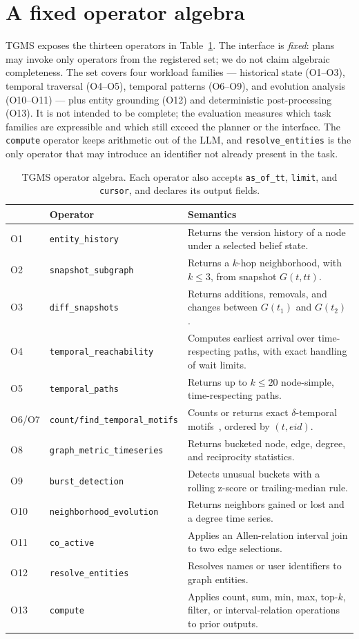 \documentclass[11pt]{article}
\begin{document}
\section{A fixed operator algebra}
\label{sec:operators}
TGMS exposes the thirteen operators in Table~\ref{tab:ops}. The
interface is \emph{fixed}: plans may invoke only operators from the
registered set; we do not claim algebraic completeness. The set covers
four workload families --- historical state (O1--O3), temporal
traversal (O4--O5), temporal patterns (O6--O9), and evolution analysis
(O10--O11) --- plus entity grounding (O12) and deterministic
post-processing (O13). It is not intended to be complete; the
evaluation measures which task families are expressible and which still
exceed the planner or the interface. The \texttt{compute} operator
keeps arithmetic out of the LLM, and \texttt{resolve\_entities} is the
only operator that may introduce an identifier not already present in
the task.

\begin{table}[t]
\centering\small
\caption{TGMS operator algebra. Each operator also accepts
\texttt{as\_of\_tt}, \texttt{limit}, and \texttt{cursor}, and declares its
output fields.}
\label{tab:ops}
\begin{tabular}{llp{8.2cm}}
\toprule
 & Operator & Semantics \\
\midrule
O1 & \texttt{entity\_history} & Returns the version history of a node under a selected belief state. \\
O2 & \texttt{snapshot\_subgraph} & Returns a $k$-hop neighborhood, with $k \le 3$, from snapshot $G(t,tt)$. \\
O3 & \texttt{diff\_snapshots} & Returns additions, removals, and changes between $G(t_1)$ and $G(t_2)$. \\
O4 & \texttt{temporal\_reachability} & Computes earliest arrival over time-respecting paths, with exact handling of wait limits. \\
O5 & \texttt{temporal\_paths} & Returns up to $k \le 20$ node-simple, time-respecting paths. \\
O6/O7 & \texttt{count/find\_temporal\_motifs} & Counts or returns exact $\delta$-temporal motifs~\cite{paranjape2017motifs}, ordered by $(t,\textit{eid})$. \\
O8 & \texttt{graph\_metric\_timeseries} & Returns bucketed node, edge, degree, and reciprocity statistics. \\
O9 & \texttt{burst\_detection} & Detects unusual buckets with a rolling z-score or trailing-median rule. \\
O10 & \texttt{neighborhood\_evolution} & Returns neighbors gained or lost and a degree time series. \\
O11 & \texttt{co\_active} & Applies an Allen-relation interval join to two edge selections. \\
O12 & \texttt{resolve\_entities} & Resolves names or user identifiers to graph entities. \\
O13 & \texttt{compute} & Applies count, sum, min, max, top-$k$, filter, or interval-relation operations to prior outputs. \\
\bottomrule
\end{tabular}
\end{table}
\end{document}
